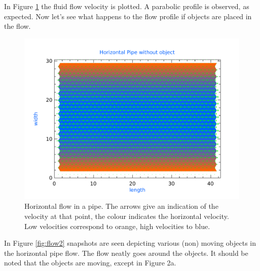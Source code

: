 In Figure \ref{fig:flow1} the fluid flow velocity is plotted. A parabolic profile is observed, as expected. Now let's see what happens to the flow profile if objects are placed in the flow.

\begin{figure}[ht!]
\centering
\includegraphics[width=.7\textwidth]{plots/flow.pdf}
\caption{Horizontal flow in a pipe. The arrows give an indication of the velocity at that point, the colour indicates the horizontal velocity. Low velocities correspond to orange, high velocities to blue. }
\label{fig:flow1}
\end{figure}



In Figure \ref{fig:flow2} snapshots are seen depicting various (non) moving objects in the horizontal pipe flow. The flow neatly goes around the objects. It should be noted that the objects are moving, except in Figure 2a.

